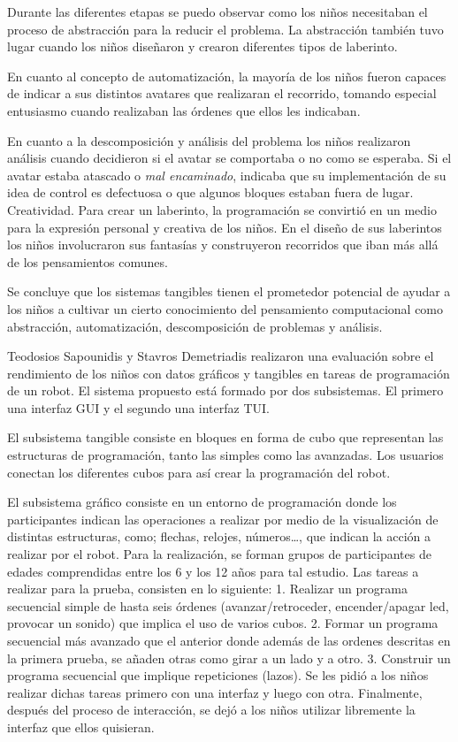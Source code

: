 Durante las diferentes etapas se puedo observar como los niños necesitaban el proceso de abstracción para la reducir el problema. La abstracción también tuvo lugar cuando los niños diseñaron y crearon diferentes tipos de laberinto. 

En cuanto al concepto de automatización, la mayoría de los niños fueron capaces de indicar a sus distintos avatares que realizaran el recorrido, tomando especial entusiasmo cuando realizaban las órdenes que ellos les indicaban. 

En cuanto a la descomposición y análisis del problema los niños realizaron análisis cuando decidieron si el avatar se comportaba o no como se esperaba. Si el avatar estaba atascado o \emph{mal encaminado}, indicaba que su implementación de su idea de control es defectuosa o que algunos bloques estaban fuera de lugar. Creatividad. Para crear un laberinto, la programación se convirtió en un medio para la expresión personal y creativa de los niños. En el diseño de sus laberintos los niños involucraron sus fantasías y construyeron recorridos que iban más allá de los pensamientos comunes.

Se concluye que los sistemas tangibles tienen el prometedor potencial de ayudar a los niños a cultivar un cierto conocimiento del pensamiento computacional como abstracción, automatización, descomposición de problemas y análisis.

Teodosios Sapounidis y Stavros Demetriadis \cite{Sapounidis} realizaron una evaluación sobre el rendimiento de los niños con datos gráficos y tangibles en tareas de programación de un robot. El sistema propuesto está formado por dos subsistemas. El primero una interfaz GUI y el segundo una interfaz TUI.

El subsistema tangible consiste en bloques en forma de cubo que representan las estructuras de programación, tanto las simples como las avanzadas. Los usuarios conectan los diferentes cubos para así crear la programación del robot.

El subsistema gráfico consiste en un entorno de programación donde los participantes indican las operaciones a realizar por medio de la visualización de distintas estructuras, como; flechas, relojes, números…, que indican la acción a realizar por el robot.
Para la realización, se forman grupos de participantes de edades comprendidas entre los 6 y los 12 años para tal estudio.
Las tareas a realizar para la prueba, consisten en lo siguiente:
1. Realizar un programa secuencial simple de hasta seis órdenes (avanzar/retroceder, encender/apagar led, provocar un sonido) que implica el uso de varios cubos.
2. Formar un programa secuencial más avanzado que el anterior donde además de las ordenes descritas en la primera prueba, se añaden otras como girar a un lado y a otro.
3. Construir un programa secuencial que implique repeticiones (lazos).
Se les pidió a los niños realizar dichas tareas primero con una interfaz y luego con otra. Finalmente, después del proceso de interacción, se dejó a los niños utilizar libremente la interfaz que ellos quisieran. 

